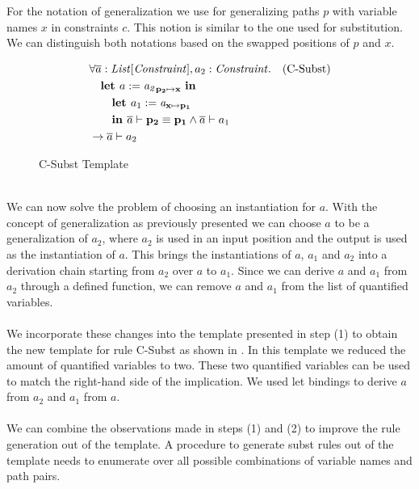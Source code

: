 For the notation of generalization we use  for
generalizing paths $p$ with variable names $x$ in constraints $c$.
This notion is similar to the one used for substitution.
We can distinguish both notations based on the swapped positions
of $p$ and $x$.
%
\begin{figure}[h]
\begin{align*}
&\forall \ovl a: \Constrs, a_2: \Constr. && \text{(C-Subst)}\\
&\quad \Let a := \gen{a_2}{\mathbf{p_2}}{\mathbf{x}}\ \In\\%
&\qquad \Let a_1 := \subst{a}{\mathbf{x}}{\mathbf{p_1}}\\ %
&\qquad \In
        \entails{\ovl a}{\pathEq{\mathbf{p_2}}{\mathbf{p_1}}}
        \land
        \entails{\ovl a}{a_1}\\
&\rightarrow \entails{\ovl a}{a_2}
\end{align*}
\caption{C-Subst Template}
\label{fig:axioms-csubst}
\end{figure}\\
We can now solve the problem of choosing an instantiation for $a$.
With the concept of generalization as previously presented
we can choose $a$ to be a generalization of $a_2$,
where $a_2$ is used in an input position
and the output is used as the instantiation of $a$.
This brings the instantiations of $a$, $a_1$ and $a_2$
into a derivation chain starting from
$a_2$ over $a$ to $a_1$.
Since we can derive $a$ and $a_1$ from $a_2$ through a defined function,
we can remove $a$ and $a_1$ from the list of quantified variables.\\
\\
We incorporate these changes into the template presented in step (1)
to obtain the new template for rule C-Subst as shown in .
In this template we reduced the amount of quantified variables to two.
These two quantified variables can be used to match the right-hand side
of the implication.
We used let bindings to derive $a$ from $a_2$ and $a_1$ from $a$.\\
\\
We can combine the observations made in steps (1) and (2)
to improve the rule generation out of the template.
A procedure to generate subst rules out of the template
needs to enumerate over all possible combinations of
variable names and path pairs.

